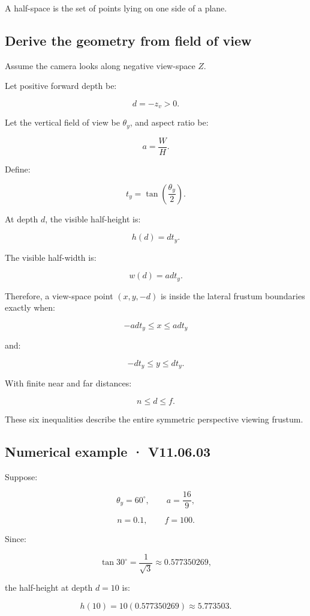 A half-space is the set of points lying on one side of a plane.

\subsection{Derive the geometry from field of view}\label{02-foundations-ii-ch034-derive-the-geometry-from-field-of-view}

Assume the camera looks along negative view-space \(Z\).

Let positive forward depth be:

\[
 d=-z_v>0.
\]

Let the vertical field of view be \(\theta_y\), and aspect ratio be:

\[
 a=\frac WH.
\]

Define:

\[
 t_y=\tan\left(\frac{\theta_y}{2}\right).
\]

At depth \(d\), the visible half-height is:

\[
 \boxed{h(d)=dt_y}.
\]

The visible half-width is:

\[
 \boxed{w(d)=ad t_y}.
\]

Therefore, a view-space point \((x,y,-d)\) is inside the lateral frustum boundaries exactly when:

\[
 \boxed{-ad t_y\le x\le ad t_y}
\]

and:

\[
 \boxed{-dt_y\le y\le dt_y}.
\]

With finite near and far distances:

\[
 \boxed{n\le d\le f}.
\]

These six inequalities describe the entire symmetric perspective viewing frustum.

\subsection{Numerical example · V11.06.03}\label{02-foundations-ii-ch034-numerical-example-v11.06.03}

Suppose:

\[
 \theta_y=60^\circ,\qquad a=\frac{16}{9},
\]

\[
 n=0.1,\qquad f=100.
\]

Since:

\[
 \tan30^\circ=\frac1{\sqrt3}\approx0.577350269,
\]

the half-height at depth \(d=10\) is:

\[
 h(10)=10(0.577350269)\approx5.773503.
\]

